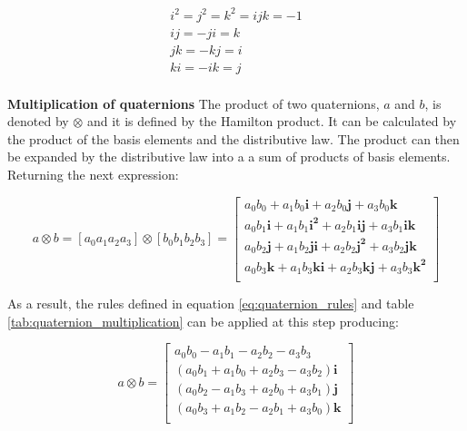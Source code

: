 \begin{equation}
    \begin{gathered}
        i^2=j^2=k^2=ijk=-1 \\
        ij = -ji = k       \\
        jk = -kj = i       \\
        ki = -ik = j       \\
    \end{gathered}
    \label{eq:quaternion_rules}
\end{equation}

\begin{figure}[H]
    \centering
    
\end{figure}

\item \textbf{Multiplication of quaternions} The product of two quaternions, $a$ and $b$, is denoted by $\otimes$ and it is defined by the Hamilton product. It can be calculated by the product of the basis elements and the distributive law. The product can then be expanded by the distributive law into a a sum of products of basis elements. Returning the next expression:

\begin{equation}
    a \otimes b = \left[a_0 a_1 a_2 a_3\right] \otimes \left[b_0 b_1 b_2 b_3\right]     =
    \begin{bmatrix}
        a_0 b_0 + a_1 b_0\boldsymbol{i} + a_2 b_0\boldsymbol{j} + a_3 b_0\boldsymbol{k}                   \\
        a_0 b_1\boldsymbol{i} + a_1 b_1\boldsymbol{i^2} + a_2 b_1\boldsymbol{ij} + a_3 b_1\boldsymbol{ik} \\
        a_0 b_2\boldsymbol{j}+ a_1 b_2\boldsymbol{ji} + a_2 b_2\boldsymbol{j^2} + a_3 b_2\boldsymbol{jk}  \\
        a_0 b_3\boldsymbol{k} + a_1 b_3\boldsymbol{ki} + a_2 b_3\boldsymbol{kj} + a_3 b_3\boldsymbol{k^2} \\
    \end{bmatrix}
\end{equation}

As a result, the rules defined in equation \ref{eq:quaternion_rules} and table \ref{tab:quaternion_multiplication} can be applied at this step producing:

\begin{equation}
    a \otimes b =
    \begin{bmatrix}
        a_0 b_0 - a_1 b_1 - a_2 b_2 - a_3 b_3                 \\
        (a_0 b_1 + a_1 b_0 + a_2 b_3 - a_3 b_2)\boldsymbol{i} \\
        (a_0 b_2 - a_1 b_3 + a_2 b_0 + a_3 b_1)\boldsymbol{j} \\
        (a_0 b_3 + a_1 b_2 - a_2 b_1 + a_3 b_0)\boldsymbol{k} \\
    \end{bmatrix}
    \label{eq:quaternion_matrix}
\end{equation}

